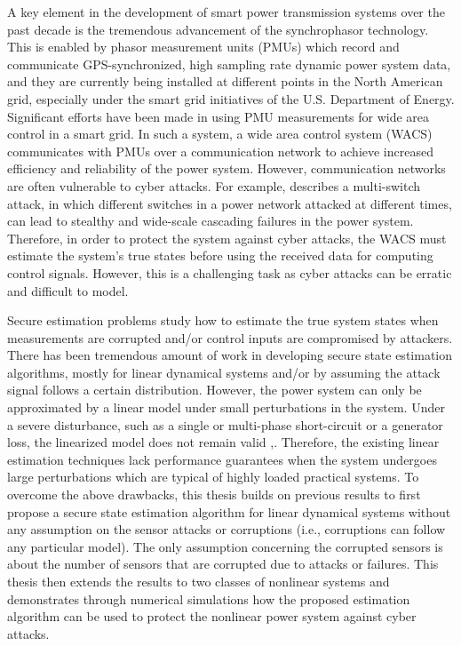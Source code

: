 \documentclass[../thesis.tex]{subfiles}
\begin{document}
A key element in the development of smart power transmission systems over the past decade is the tremendous advancement of the synchrophasor technology. 
This is enabled by phasor measurement units (PMUs) which record and communicate GPS-synchronized, high sampling rate dynamic power system data, and they are currently being installed at different points in the North American grid, especially under the smart grid initiatives of the U.S. Department of Energy.
Significant efforts have been made in using PMU measurements for wide area control in a smart grid. 
In such a system, a wide area control system (WACS) communicates with PMUs over a communication network to achieve increased efficiency and reliability of the power system.
However, communication networks are often vulnerable to cyber attacks. 
For example, \cite{liu2014coordinated} describes a multi-switch attack, in which different switches in a power network attacked at different times, can lead to stealthy and wide-scale cascading failures in the power system.
Therefore, in order to protect the system against cyber attacks, the WACS must estimate the system's true states before using the received data for computing control signals.
However, this is a challenging task as cyber attacks can be erratic and difficult to model. 

Secure estimation problems study how to estimate the true system states when measurements are corrupted and/or control inputs are compromised by attackers.
There has been tremendous amount of work in developing secure state estimation algorithms, mostly for linear dynamical systems and/or by assuming the attack signal follows a certain distribution.
However, the power system can only be approximated by a linear model under small perturbations in the system. 
Under a severe disturbance, such as a single or multi-phase short-circuit or a generator loss, the linearized model does not remain valid \cite{Kundur},\cite{nonlin_est}. 
Therefore, the existing linear estimation techniques lack performance guarantees when the system undergoes large perturbations which are typical of highly loaded practical systems. 
To overcome the above drawbacks, this thesis builds on previous results to first propose a secure state estimation algorithm for linear dynamical systems without any assumption on the sensor attacks or corruptions (i.e., corruptions can follow any particular model).
The only assumption concerning the corrupted sensors is about the number of sensors that are corrupted due to attacks or failures. 
This thesis then extends the results to two classes of nonlinear systems and demonstrates through numerical simulations how the proposed estimation algorithm can be used to protect the nonlinear power system against cyber attacks.
\end{document}
